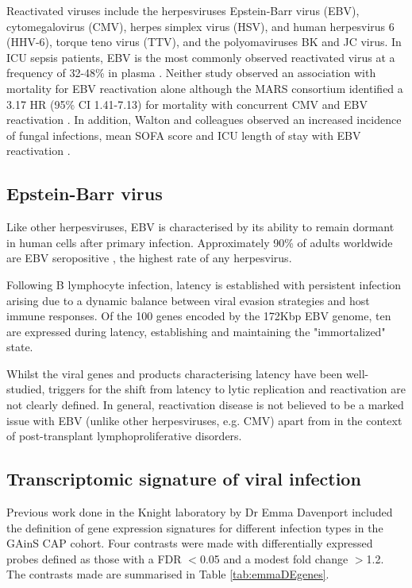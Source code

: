Reactivated viruses include the herpesviruses Epstein-Barr virus (EBV), cytomegalovirus (CMV), herpes simplex virus (HSV), and human herpesvirus 6 (HHV-6), torque teno virus (TTV), and the polyomaviruses BK and JC virus. In ICU sepsis patients, EBV is the most commonly observed reactivated virus at a frequency of 32-48\% in plasma \parencite{Walton2014} \parencite{Ong2017}. Neither study observed an association with mortality for EBV reactivation alone although the MARS consortium identified a 3.17 HR (95\% CI 1.41-7.13) for mortality with concurrent CMV and EBV reactivation \parencite{Ong2017}. In addition, Walton and colleagues observed an increased incidence of fungal infections, mean SOFA score and ICU length of stay with EBV reactivation \parencite{Walton2014}.

\subsection{Epstein-Barr virus}
Like other herpesviruses, EBV is characterised by its ability to remain dormant in human cells after primary infection. Approximately 90\% of adults worldwide are EBV seropositive \parencite{Cohen2000}, the highest rate of any herpesvirus. 

Following B lymphocyte infection, latency is established with persistent infection arising due to a dynamic balance between viral evasion strategies and host immune responses. Of the 100 genes encoded by the 172Kbp EBV genome, ten are expressed during latency, establishing and maintaining the "immortalized" state. 

Whilst the viral genes and products characterising latency have been well-studied, triggers for the shift from latency to lytic replication and reactivation are not clearly defined. In general, reactivation disease is not believed to be a marked issue with EBV (unlike other herpesviruses, e.g. CMV) apart from in the context of post-transplant lymphoproliferative disorders.

\subsection{Transcriptomic signature of viral infection}
Previous work done in the Knight laboratory by Dr Emma Davenport included the definition of gene expression signatures for different infection types in the GAinS CAP cohort. Four contrasts were made with differentially expressed probes defined as those with a FDR $<$0.05 and a modest fold change $>$1.2. The contrasts made are summarised in Table \ref{tab:emmaDEgenes}. 

